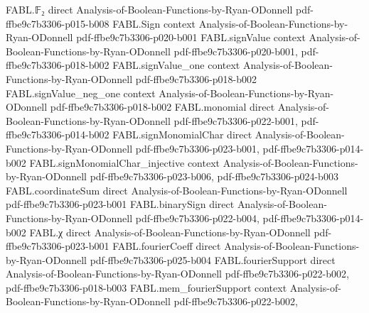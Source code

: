 \begin{theorem}
\label{FABL.CNFFormula.clause_width_eq_dimension_of_computes_parity}
\leanok
{}
\proofstep
  {FABL.𝔽₂}
  {direct}
  {Analysis-of-Boolean-Functions-by-Ryan-ODonnell}
  {pdf-ffbe9c7b3306-p015-b008}
\proofstep
  {FABL.Sign}
  {context}
  {Analysis-of-Boolean-Functions-by-Ryan-ODonnell}
  {pdf-ffbe9c7b3306-p020-b001}
\proofstep
  {FABL.signValue}
  {context}
  {Analysis-of-Boolean-Functions-by-Ryan-ODonnell}
  {pdf-ffbe9c7b3306-p020-b001,
    pdf-ffbe9c7b3306-p018-b002}
\proofstep
  {FABL.signValue_one}
  {context}
  {Analysis-of-Boolean-Functions-by-Ryan-ODonnell}
  {pdf-ffbe9c7b3306-p018-b002}
\proofstep
  {FABL.signValue_neg_one}
  {context}
  {Analysis-of-Boolean-Functions-by-Ryan-ODonnell}
  {pdf-ffbe9c7b3306-p018-b002}
\proofstep
  {FABL.monomial}
  {direct}
  {Analysis-of-Boolean-Functions-by-Ryan-ODonnell}
  {pdf-ffbe9c7b3306-p022-b001,
    pdf-ffbe9c7b3306-p014-b002}
\proofstep
  {FABL.signMonomialChar}
  {direct}
  {Analysis-of-Boolean-Functions-by-Ryan-ODonnell}
  {pdf-ffbe9c7b3306-p023-b001,
    pdf-ffbe9c7b3306-p014-b002}
\proofstep
  {FABL.signMonomialChar_injective}
  {context}
  {Analysis-of-Boolean-Functions-by-Ryan-ODonnell}
  {pdf-ffbe9c7b3306-p023-b006,
    pdf-ffbe9c7b3306-p024-b003}
\proofstep
  {FABL.coordinateSum}
  {direct}
  {Analysis-of-Boolean-Functions-by-Ryan-ODonnell}
  {pdf-ffbe9c7b3306-p023-b001}
\proofstep
  {FABL.binarySign}
  {direct}
  {Analysis-of-Boolean-Functions-by-Ryan-ODonnell}
  {pdf-ffbe9c7b3306-p022-b004,
    pdf-ffbe9c7b3306-p014-b002}
\proofstep
  {FABL.χ}
  {direct}
  {Analysis-of-Boolean-Functions-by-Ryan-ODonnell}
  {pdf-ffbe9c7b3306-p023-b001}
\proofstep
  {FABL.fourierCoeff}
  {direct}
  {Analysis-of-Boolean-Functions-by-Ryan-ODonnell}
  {pdf-ffbe9c7b3306-p025-b004}
\proofstep
  {FABL.fourierSupport}
  {direct}
  {Analysis-of-Boolean-Functions-by-Ryan-ODonnell}
  {pdf-ffbe9c7b3306-p022-b002,
    pdf-ffbe9c7b3306-p018-b003}
\proofstep
  {FABL.mem_fourierSupport}
  {context}
  {Analysis-of-Boolean-Functions-by-Ryan-ODonnell}
  {pdf-ffbe9c7b3306-p022-b002,
}
\end{theorem}
